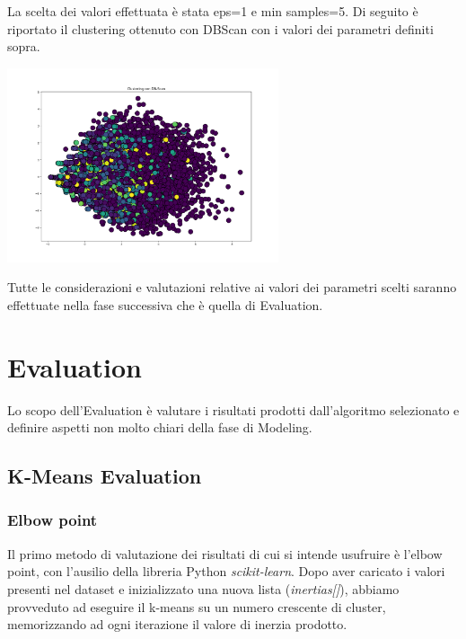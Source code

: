\documentclass[a4paper, 10pt]{report}
\begin{document}
                La scelta dei valori effettuata è stata eps=1 e min samples=5. Di seguito è riportato il clustering ottenuto con
                DBScan con i valori dei parametri definiti sopra.

                \begin{center}
                    \includegraphics[width=8cm]{modelling/DBScan.png}\\
                \end{center}

                Tutte le considerazioni e valutazioni relative ai valori dei parametri scelti saranno effettuate nella fase successiva
                che è quella di Evaluation.


    \chapter{Evaluation}\label{ch:evaluation}

        Lo scopo dell'Evaluation è valutare i risultati prodotti dall'algoritmo selezionato e definire aspetti non molto chiari della
        fase di Modeling.

        \section{K-Means Evaluation}\label{sec:k-means-evaluation}
            \subsection{Elbow point}
                Il primo metodo di valutazione dei risultati di cui si intende usufruire è l'elbow point, con l'ausilio della
                libreria Python \textit{scikit-learn}. Dopo aver caricato i valori presenti nel dataset e inizializzato una nuova
                lista (\textit{inertias[]}), abbiamo provveduto ad eseguire il k-means su un numero crescente di cluster, memorizzando
                ad ogni iterazione il valore di inerzia prodotto.
\end{document}
